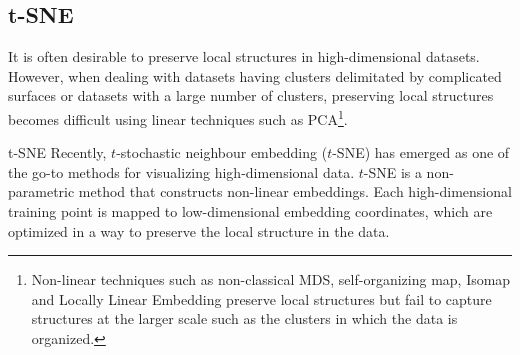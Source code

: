 \subsection{t-SNE}
\label{subsec:dimRedTSNE}
It is often desirable to preserve local structures in high-dimensional datasets. However, when dealing with datasets having clusters delimitated by complicated surfaces or datasets with a large number of clusters, preserving local structures becomes difficult using linear techniques such as PCA\footnote{Non-linear techniques such as non-classical MDS, self-organizing map, Isomap and Locally Linear Embedding preserve local structures but fail to capture structures at the larger scale such as the clusters in which the data is organized.}.
\begin{mybox}{t-SNE}
	Recently, $t$-stochastic neighbour embedding ($t$-SNE) has emerged as one of the go-to methods for visualizing high-dimensional data. $t$-SNE is a non-parametric method that constructs non-linear embeddings. Each high-dimensional training point is mapped to low-dimensional embedding coordinates, which are optimized in a way to preserve the local structure in the data.
\end{mybox}
